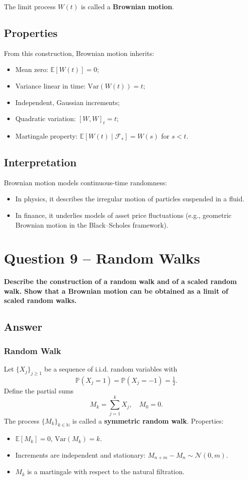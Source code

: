 \documentclass[12pt,a4paper]{book}
\theoremstyle{remark}
\newcommand{\PP}{\mathbb{P}}          %
\newcommand{\EE}{\mathbb{E}}          %
\newcommand{\NN}{\mathbb{N}}
\newcommand{\F}{\mathcal{F}}          %
\newcommand{\Var}{\mathrm{Var}}       %
\newcommand{\Normal}{\mathcal{N}}
\begin{document}
The limit process $W(t)$ is called a \textbf{Brownian motion}.

\subsection*{Properties}
From this construction, Brownian motion inherits:
\begin{itemize}
    \item Mean zero: $\EE[W(t)] = 0$;
    \item Variance linear in time: $\Var(W(t)) = t$;
    \item Independent, Gaussian increments;
    \item Quadratic variation: $[W,W]_t = t$;
    \item Martingale property: $\EE[W(t) \mid \F_s] = W(s)$ for $s < t$.
\end{itemize}

\subsection*{Interpretation}
Brownian motion models continuous-time randomness:
\begin{itemize}
    \item In physics, it describes the irregular motion of particles suspended in a fluid.
    \item In finance, it underlies models of asset price fluctuations (e.g., geometric Brownian motion in the Black--Scholes framework).
\end{itemize}










\newpage
\section{Question 9 -- Random Walks}
\textbf{Describe the construction of a random walk and of a scaled random walk. Show that a Brownian motion can be obtained as a limit of scaled random walks.}

\subsection*{Answer}

\subsubsection*{Random Walk}
Let $\{X_j\}_{j\geq 1}$ be a sequence of i.i.d. random variables with
\[
\PP(X_j = 1) = \PP(X_j = -1) = \tfrac{1}{2}.
\]
Define the partial sums
\[
M_k = \sum_{j=1}^k X_j, \quad M_0=0.
\]
The process $\{M_k\}_{k\in\NN}$ is called a \textbf{symmetric random walk}.  
Properties:
\begin{itemize}
    \item $\EE[M_k] = 0$, $\Var(M_k) = k$.
    \item Increments are independent and stationary: $M_{n+m}-M_n \sim \Normal(0,m)$.
    \item $M_k$ is a martingale with respect to the natural filtration.
\end{itemize}
\end{document}
